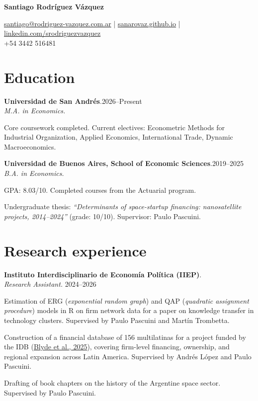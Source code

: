 \documentclass[11pt]{article}
\newcommand{\cvname}{Santiago Rodríguez Vázquez}
\newcommand{\entrydate}[1]{\hfill{\small{#1}}}
\begin{document}
\thispagestyle{firstpage}

{\LARGE\bfseries {\cvname}}

\href{mailto:santiago@rodriguez-vazquez.com.ar}{santiago@rodriguez-vazquez.com.ar} | \href{https://sanarovaz.github.io}{sanarovaz.github.io} | \href{https://www.linkedin.com/in/srodriguezvazquez/?locale=en-US}{linkedin.com/srodriguezvazquez}
\\
+54 3442 516481


\section{Education}
\textbf{Universidad de San Andrés}.\entrydate{2026--Present}\\
\textit{M.A. in Economics.}
\begin{cvitems}
  \item Core coursework completed. Current electives: Econometric Methods for Industrial Organization, Applied Economics, International Trade,
        Dynamic Macroeconomics.
\end{cvitems}

\smallskip
\textbf{Universidad de Buenos Aires, School of Economic Sciences}.\entrydate{2019--2025}\\
\textit{B.A. in Economics.}
\begin{cvitems}
  \item GPA: 8.03/10. Completed courses from the Actuarial program.
  \item Undergraduate thesis: \emph{``Determinants of space-startup financing:
        nanosatellite projects, 2014--2024''} (grade: 10/10). Supervisor: Paulo Pascuini.
\end{cvitems}

\section{Research experience}
\textbf{Instituto Interdisciplinario de Economía Política (IIEP)}.
\\
\textit{Research Assistant.} \entrydate{2024--2026}
\begin{cvitems}
    \item Estimation of ERG (\textit{exponential random graph}) and QAP (\textit{quadratic assignment procedure}) models in R on firm network data for a paper on knowledge transfer in technology clusters. Supervised by Paulo Pascuini and Martín Trombetta.
    \item Construction of a financial database of 156 multilatinas for a project funded by the IDB (\href{https://publications.iadb.org/es/multilatinas-en-movimiento-caracteristicas-motivaciones-y-lineamientos-de-politica}{Blyde et al., 2025}), covering firm-level financing, ownership, and regional expansion across Latin America. Supervised by Andrés López and Paulo Pascuini.
    \item Drafting of book chapters on the history of the Argentine space sector. Supervised by Paulo Pascuini.
\end{cvitems}
\end{document}
